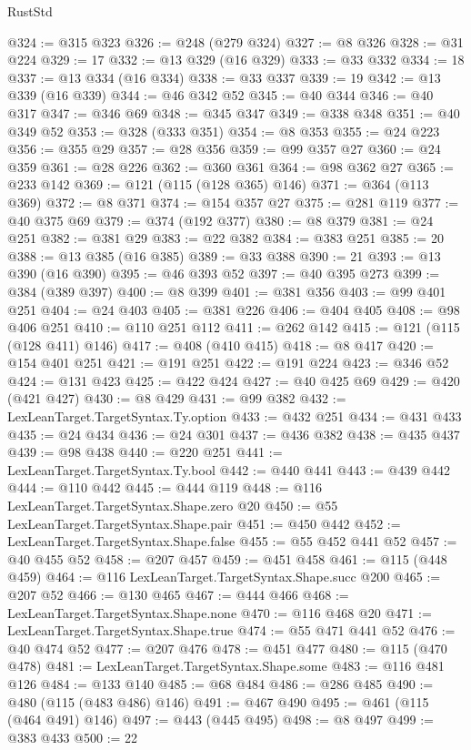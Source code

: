 \begin{lexlean}{RustStd}
\begin{coremodule}
@324 := @315 @323
@326 := @248 (@279 @324)
@327 := @8 @326
@328 := @31 @224
@329 := 17
@332 := @13 @329 (@16 @329)
@333 := @33 @332
@334 := 18
@337 := @13 @334 (@16 @334)
@338 := @33 @337
@339 := 19
@342 := @13 @339 (@16 @339)
@344 := @46 @342 @52
@345 := @40 @344
@346 := @40 @317
@347 := @346 @69
@348 := @345 @347
@349 := @338 @348
@351 := @40 @349 @52
@353 := @328 (@333 @351)
@354 := @8 @353
@355 := @24 @223
@356 := @355 @29
@357 := @28 @356
@359 := @99 @357 @27
@360 := @24 @359
@361 := @28 @226
@362 := @360 @361
@364 := @98 @362 @27
@365 := @233 @142
@369 := @121 (@115 (@128 @365) @146)
@371 := @364 (@113 @369)
@372 := @8 @371
@374 := @154 @357 @27
@375 := @281 @119
@377 := @40 @375 @69
@379 := @374 (@192 @377)
@380 := @8 @379
@381 := @24 @251
@382 := @381 @29
@383 := @22 @382
@384 := @383 @251
@385 := 20
@388 := @13 @385 (@16 @385)
@389 := @33 @388
@390 := 21
@393 := @13 @390 (@16 @390)
@395 := @46 @393 @52
@397 := @40 @395 @273
@399 := @384 (@389 @397)
@400 := @8 @399
@401 := @381 @356
@403 := @99 @401 @251
@404 := @24 @403
@405 := @381 @226
@406 := @404 @405
@408 := @98 @406 @251
@410 := @110 @251 @112
@411 := @262 @142
@415 := @121 (@115 (@128 @411) @146)
@417 := @408 (@410 @415)
@418 := @8 @417
@420 := @154 @401 @251
@421 := @191 @251
@422 := @191 @224
@423 := @346 @52
@424 := @131 @423
@425 := @422 @424
@427 := @40 @425 @69
@429 := @420 (@421 @427)
@430 := @8 @429
@431 := @99 @382
@432 := LexLeanTarget.TargetSyntax.Ty.option
@433 := @432 @251
@434 := @431 @433
@435 := @24 @434
@436 := @24 @301
@437 := @436 @382
@438 := @435 @437
@439 := @98 @438
@440 := @220 @251
@441 := LexLeanTarget.TargetSyntax.Ty.bool
@442 := @440 @441
@443 := @439 @442
@444 := @110 @442
@445 := @444 @119
@448 := @116 LexLeanTarget.TargetSyntax.Shape.zero @20
@450 := @55 LexLeanTarget.TargetSyntax.Shape.pair
@451 := @450 @442
@452 := LexLeanTarget.TargetSyntax.Shape.false
@455 := @55 @452 @441 @52
@457 := @40 @455 @52
@458 := @207 @457
@459 := @451 @458
@461 := @115 (@448 @459)
@464 := @116 LexLeanTarget.TargetSyntax.Shape.succ @200
@465 := @207 @52
@466 := @130 @465
@467 := @444 @466
@468 := LexLeanTarget.TargetSyntax.Shape.none
@470 := @116 @468 @20
@471 := LexLeanTarget.TargetSyntax.Shape.true
@474 := @55 @471 @441 @52
@476 := @40 @474 @52
@477 := @207 @476
@478 := @451 @477
@480 := @115 (@470 @478)
@481 := LexLeanTarget.TargetSyntax.Shape.some
@483 := @116 @481 @126
@484 := @133 @140
@485 := @68 @484
@486 := @286 @485
@490 := @480 (@115 (@483 @486) @146)
@491 := @467 @490
@495 := @461 (@115 (@464 @491) @146)
@497 := @443 (@445 @495)
@498 := @8 @497
@499 := @383 @433
@500 := 22

\end{coremodule}
\end{lexlean}
